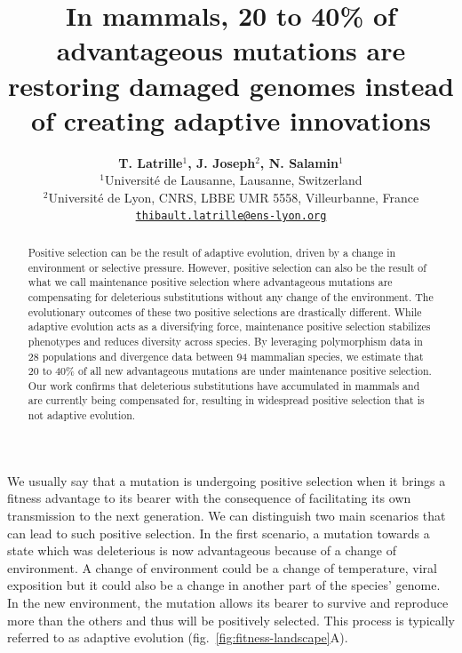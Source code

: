 \documentclass{article}
\title{In mammals, 20 to 40\% of advantageous mutations are restoring damaged genomes instead of creating adaptive innovations}
\author{
    \large
    \textbf{T. {Latrille}$^{1}$, J. {Joseph}$^{2}$, N. {Salamin}$^{1}$}\\
    \normalsize
    $^{1}$Université de Lausanne, Lausanne, Switzerland\\
    $^{2}$Université de Lyon, CNRS, LBBE UMR 5558, Villeurbanne, France \\
    \texttt{\href{mailto:thibault.latrille@ens-lyon.org}{thibault.latrille@ens-lyon.org}} \\
}
\newcommand{\NS}[1]{\textcolor{red}{\textbf{\emph{[NS: #1]}}}}
\begin{document}
    \maketitle

    \begin{abstract}
        Positive selection can be the result of adaptive evolution, driven by a change in environment or selective pressure.
        However, positive selection can also be the result of what we call maintenance positive selection where advantageous mutations are compensating for deleterious substitutions without any change of the environment.
        The evolutionary outcomes of these two positive selections are drastically different.
        While adaptive evolution acts as a diversifying force, maintenance positive selection stabilizes phenotypes and reduces diversity across species.
        By leveraging polymorphism data in 28 populations and divergence data between 94 mammalian species, we estimate that 20 to 40\% of all new advantageous mutations are under maintenance positive selection.
        Our work confirms that deleterious substitutions have accumulated in mammals and are currently being compensated for, resulting in widespread positive selection that is not adaptive evolution.
    \end{abstract}


    We usually say that a mutation is undergoing positive selection when it brings a fitness advantage to its bearer with the consequence of facilitating its own transmission to the next generation.
    We can distinguish two main scenarios that can lead to such positive selection.
    In the first scenario, a mutation towards a state which was deleterious is now advantageous because of a change of environment.
    A change of environment could be a change of temperature, viral exposition but it could also be a change in another part of the species' genome.
    In the new environment, the mutation allows its bearer to survive and reproduce more than the others and thus will be positively selected.
    This process is typically referred to as adaptive evolution (fig.~\ref{fig:fitness-landscape}A).
\end{document}
